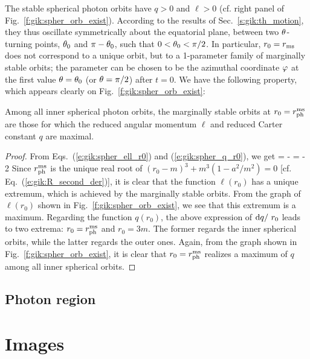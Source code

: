 The stable spherical photon orbits have $q>0$ and $\ell > 0$
(cf. right panel of Fig.~\ref{f:gik:spher_orb_exist}).
According to the results of Sec.~\ref{s:gik:th_motion}, they
thus oscillate symmetrically about the equatorial plane, between
two $\theta$-turning points, $\theta_0$ and $\pi-\theta_0$, such that $0<\theta_0<\pi/2$.
In particular, $r_0 = r_{\rm ms}$ does not correspond to a unique orbit, but
to a 1-parameter family of marginally stable orbits; the parameter can be chosen
to be the azimuthal coordinate $\varphi$ at the first value $\theta=\theta_0$ (or $\theta=\pi/2$)
after $t=0$.
We have the following property, which appears clearly on Fig.~\ref{f:gik:spher_orb_exist}:
\begin{greybox}
Among all inner spherical photon orbits, the marginally stable orbits
at $r_0 = r_{\rm ph}^{\rm ms}$ are those for which the reduced angular momentum $\ell$
and reduced Carter constant $q$ are maximal.
\end{greybox}
\begin{proof}
From Eqs.~(\ref{e:gik:spher_ell_r0}) and (\ref{e:gik:spher_q_r0}), we get
\be
    = - 
\ee
\be
    = - 2 
\ee
Since $r_{\rm ph}^{\rm ms}$ is the unique real root of
$(r_0 - m)^3 + m^3 (1 - a^2/m^2) = 0$ [cf. Eq.~(\ref{e:gik:R_second_der})],
it is clear that the function $\ell(r_0)$ has a unique extremum, which is
achieved by the marginally stable orbits. From the graph of $\ell(r_0)$
shown in Fig.~\ref{f:gik:spher_orb_exist}, we see that this extremum is
a maximum. Regarding the function $q(r_0)$, the above expression of $\mathrm{d} q/\ r_0$
leads to two extrema: $r_0 = r_{\rm ph}^{\rm ms}$ and $r_0 = 3 m$.
The former regards the inner spherical orbits, while the latter regards
the outer ones. Again, from the graph shown in Fig.~\ref{f:gik:spher_orb_exist},
it is clear that $r_0 = r_{\rm ph}^{\rm ms}$ realizes a maximum of $q$
among all inner spherical orbits.
\end{proof}

\subsection{Photon region}

\section{Images}

















